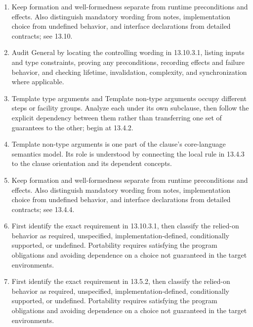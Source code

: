 \documentclass[11pt,letterpaper]{article}
\begin{document}
\begin{enumerate}
\item Keep formation and well-formedness separate from runtime preconditions and effects. Also distinguish mandatory wording from notes, implementation choice from undefined behavior, and interface declarations from detailed contracts; see 13.10.
\item Audit General by locating the controlling wording in 13.10.3.1, listing inputs and type constraints, proving any preconditions, recording effects and failure behavior, and checking lifetime, invalidation, complexity, and synchronization where applicable.
\item Template type arguments and Template non-type arguments occupy different steps or facility groups. Analyze each under its own subclause, then follow the explicit dependency between them rather than transferring one set of guarantees to the other; begin at 13.4.2.
\item Template non-type arguments is one part of the clause's core-language semantics model. Its role is understood by connecting the local rule in 13.4.3 to the clause orientation and its dependent concepts.
\item Keep formation and well-formedness separate from runtime preconditions and effects. Also distinguish mandatory wording from notes, implementation choice from undefined behavior, and interface declarations from detailed contracts; see 13.4.4.
\item First identify the exact requirement in 13.10.3.1, then classify the relied-on behavior as required, unspecified, implementation-defined, conditionally supported, or undefined. Portability requires satisfying the program obligations and avoiding dependence on a choice not guaranteed in the target environments.
\item First identify the exact requirement in 13.5.2, then classify the relied-on behavior as required, unspecified, implementation-defined, conditionally supported, or undefined. Portability requires satisfying the program obligations and avoiding dependence on a choice not guaranteed in the target environments.
\end{enumerate}
\end{document}
